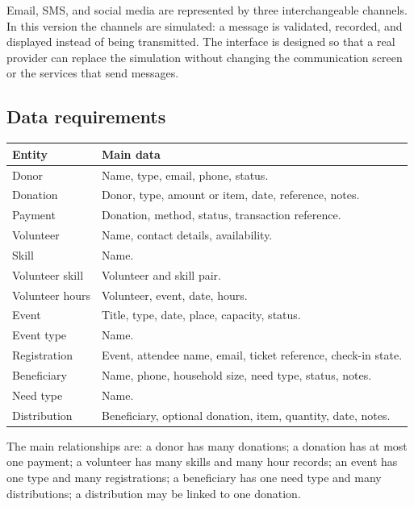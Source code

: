 Email, SMS, and social media are represented by three interchangeable channels. In this version the channels are simulated: a message is validated, recorded, and displayed instead of being transmitted. The interface is designed so that a real provider can replace the simulation without changing the communication screen or the services that send messages.

\subsection{Data requirements}

\begin{center}
\small
\begin{tabularx}{\textwidth}{@{}L{0.24\textwidth}Y@{}}
\toprule
\textbf{Entity} & \textbf{Main data} \\
\midrule
Donor & Name, type, email, phone, status. \\
Donation & Donor, type, amount or item, date, reference, notes. \\
Payment & Donation, method, status, transaction reference. \\
Volunteer & Name, contact details, availability. \\
Skill & Name. \\
Volunteer skill & Volunteer and skill pair. \\
Volunteer hours & Volunteer, event, date, hours. \\
Event & Title, type, date, place, capacity, status. \\
Event type & Name. \\
Registration & Event, attendee name, email, ticket reference, check-in state. \\
Beneficiary & Name, phone, household size, need type, status, notes. \\
Need type & Name. \\
Distribution & Beneficiary, optional donation, item, quantity, date, notes. \\
\bottomrule
\end{tabularx}
\end{center}

The main relationships are: a donor has many donations; a donation has at most one payment; a volunteer has many skills and many hour records; an event has one type and many registrations; a beneficiary has one need type and many distributions; a distribution may be linked to one donation.
